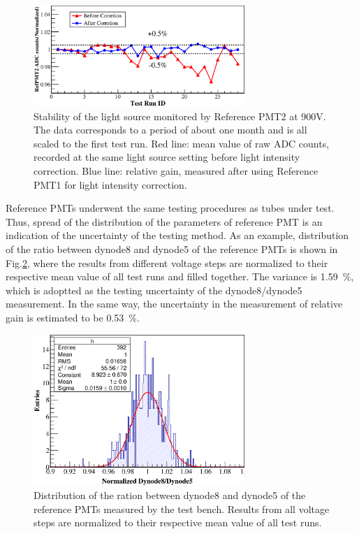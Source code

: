 \documentclass[5p, times]{elsarticle}
\begin{document}
\begin{figure}
 \centering
 \includegraphics[width=80mm]{led_stability}
\caption{Stability of the light source monitored by Reference PMT2 at 900V.
The data corresponds to a period of about one month and is all scaled to the first test run.
Red line: mean value of raw ADC counts, recorded at the same light source setting before light intensity correction.
Blue line: relative gain, measured after using Reference PMT1 for light intensity correction.}
\label{fig:led_stability}
\end{figure} 

Reference PMTs underwent the same testing procedures as tubes under test.
Thus, spread of the distribution of the parameters of reference PMT is an indication of the uncertainty of the testing method.
As an example, distribution of the ratio between dynode8 and dynode5 of the reference PMTs is shown in Fig.\ref{fig:dy58_stabiltiy}, where the results from different voltage steps are normalized to their respective mean value of all test runs and filled together.
The variance is \SI{1.59}{\percent}, which is adoptted as the testing uncertainty of the dynode8/dynode5 measurement.
In the same way, the uncertainty in the measurement of relative gain is estimated to be \SI{0.53}{\percent}. 

\begin{figure}
 \centering
 \includegraphics[width=80mm]{RefDy58Dist}
\caption{Distribution of the ration between dynode8 and dynode5 of the reference PMTs measured by the test bench.
Results from all voltage steps are normalized to their respective mean value of all test runs.}
\label{fig:dy58_stabiltiy}
\end{figure} 
\end{document}
